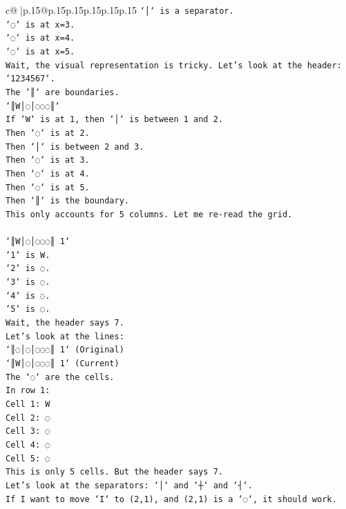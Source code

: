 \documentclass{article}
\begin{document}
{\begin{supertabular}{c@{$\;$}|p{.15\linewidth}@{}p{.15\linewidth}p{.15\linewidth}p{.15\linewidth}p{.15\linewidth}p{.15\linewidth}}
{{{\texttt{`│` is a separator.} \\
\texttt{`◌` is at x=3.} \\
\texttt{`◌` is at x=4.} \\
\texttt{`◌` is at x=5.} \\
\texttt{Wait, the visual representation is tricky. Let's look at the header: `1234567`.} \\
\texttt{The `║` are boundaries.} \\
\texttt{`║W│◌│◌◌◌║`} \\
\texttt{If `W` is at 1, then `│` is between 1 and 2.} \\
\texttt{Then `◌` is at 2.} \\
\texttt{Then `│` is between 2 and 3.} \\
\texttt{Then `◌` is at 3.} \\
\texttt{Then `◌` is at 4.} \\
\texttt{Then `◌` is at 5.} \\
\texttt{Then `║` is the boundary.} \\
\texttt{This only accounts for 5 columns. Let me re{-}read the grid.} \\
\\ 
\texttt{`║W│◌│◌◌◌║ 1`} \\
\texttt{`1` is W.} \\
\texttt{`2` is ◌.} \\
\texttt{`3` is ◌.} \\
\texttt{`4` is ◌.} \\
\texttt{`5` is ◌.} \\
\texttt{Wait, the header says 7.} \\
\texttt{Let's look at the lines:} \\
\texttt{`║◌│◌│◌◌◌║ 1` (Original)} \\
\texttt{`║W│◌│◌◌◌║ 1` (Current)} \\
\texttt{The `◌` are the cells.} \\
\texttt{In row 1:} \\
\texttt{Cell 1: W} \\
\texttt{Cell 2: ◌} \\
\texttt{Cell 3: ◌} \\
\texttt{Cell 4: ◌} \\
\texttt{Cell 5: ◌} \\
\texttt{This is only 5 cells. But the header says 7.} \\
\texttt{Let's look at the separators: `│` and `┼` and `┤`.} \\
\texttt{If I want to move `I` to (2,1), and (2,1) is a `◌`, it should work.} \\
}}}
\end{supertabular}}
\end{document}
